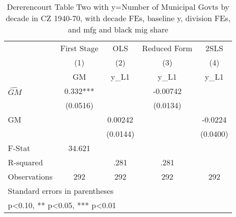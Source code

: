 \begin{table}[htbp]\centering
\def\sym#1{\ifmmode^{#1}\else\(^{#1}\)\fi}
\caption{Dererencourt Table Two with y=Number of Municipal Govts by decade in CZ 1940-70, with decade FEs, baseline y, division FEs, and mfg and black mig share}
\begin{tabular}{l*{4}{c}}
\toprule
                    & First Stage   &         OLS   &Reduced Form   &        2SLS   \\
                    &\multicolumn{1}{c}{(1)}&\multicolumn{1}{c}{(2)}&\multicolumn{1}{c}{(3)}&\multicolumn{1}{c}{(4)}\\
                    &\multicolumn{1}{c}{GM}&\multicolumn{1}{c}{y\_L1}&\multicolumn{1}{c}{y\_L1}&\multicolumn{1}{c}{y\_L1}\\
\midrule
$\hat{GM}$          &       0.332***&               &    -0.00742   &               \\
                    &    (0.0516)   &               &    (0.0134)   &               \\
\addlinespace
GM                  &               &     0.00242   &               &     -0.0224   \\
                    &               &    (0.0144)   &               &    (0.0400)   \\
\midrule
F-Stat              &      34.621   &               &               &               \\
R-squared           &               &        .281   &        .281   &               \\
Observations        &         292   &         292   &         292   &         292   \\
\bottomrule
\multicolumn{5}{l}{\footnotesize Standard errors in parentheses}\\
\multicolumn{5}{l}{\footnotesize * p<0.10, ** p<0.05, *** p<0.01}\\
\end{tabular}
\end{table}
